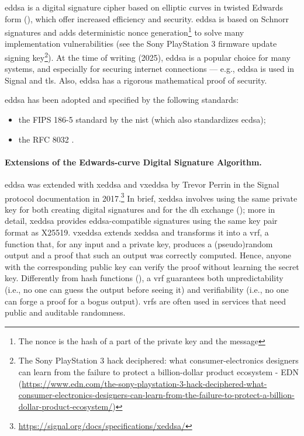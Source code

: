 \gls{eddsa} is a digital signature cipher based on elliptic curves in twisted Edwards form (), which offer increased efficiency and security. \gls{eddsa} is based on Schnorr signatures and adds deterministic nonce generation\footnote{The nonce is the hash of a part of the private key and the message} to solve many implementation vulnerabilities (see the Sony PlayStation 3 firmware update signing key\footnote{The Sony PlayStation 3 hack deciphered: what consumer-electronics designers can learn from the failure to protect a billion-dollar product ecosystem - EDN (\url{https://www.edn.com/the-sony-playstation-3-hack-deciphered-what-consumer-electronics-designers-can-learn-from-the-failure-to-protect-a-billion-dollar-product-ecosystem/})}). At the time of writing (2025), \gls{eddsa} is a popular choice for many systems, and especially for securing internet connections --- e.g., \gls{eddsa} is used in Signal 
and \gls{tls}.
Also, \gls{eddsa} has a rigorous mathematical proof of security.

\gls{eddsa} has been adopted and specified by the following standards:
\begin{itemize}
	\item the FIPS 186-5 standard \cite{nist_ecdsa_2023} by the \gls{nist} (which also standardizes \gls{ecdsa});
	\item the RFC 8032 \cite{rfc8032}.
\end{itemize}


\paragraph*{Extensions of the Edwards-curve Digital Signature Algorithm.} \gls{eddsa} was extended with \gls{xeddsa} and \gls{vxeddsa} by Trevor Perrin in the Signal protocol documentation in 2017.\footnote{\url{https://signal.org/docs/specifications/xeddsa/}} In brief, \gls{xeddsa} involves using the same private key for both creating digital signatures and for the \gls{dh} exchange (); more in detail, \gls{xeddsa} provides \gls{eddsa}-compatible signatures using the same key pair format as X25519. \gls{vxeddsa} extends \gls{xeddsa} and transforms it into a \gls{vrf}, a function that, for any input and a private key, produces a (pseudo)random output and a proof that such an output was correctly computed. Hence, anyone with the corresponding public key can verify the proof without learning the secret key. Differently from hash functions (), a \gls{vrf} guarantees both unpredictability (i.e., no one can guess the output before seeing it) and verifiability (i.e., no one can forge a proof for a bogus output). \glspl{vrf} are often used in services that need public and auditable randomness.


